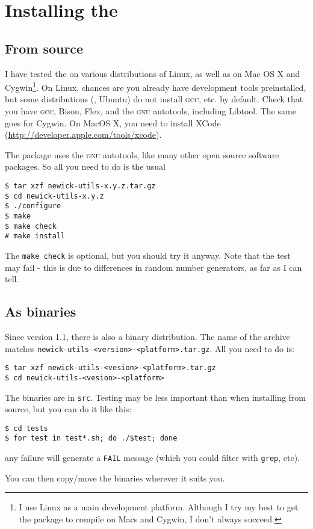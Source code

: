 \chapter{Installing the \nutils}

\section{From source}

I have tested the \nutils{} on various distributions of Linux, as well as on
Mac OS X and Cygwin\footnote{I use Linux as a main development platform.
Although I try my best to get the package to compile on Macs and Cygwin, I don't
always succeed.}. On Linux, chances are you already have development tools
preinstalled, but some distributions (\eg, Ubuntu) do not install \textsc{gcc},
etc. by default. Check that you have \textsc{gcc}, Bison, Flex, and the
\textsc{gnu} autotools, including Libtool. The same goes for Cygwin. On MacOS X,
you need to install XCode (\url{http://developer.apple.com/tools/xcode}).

The package uses the \textsc{gnu} autotools, like many other open source
software packages. So all you need to do is the usual
\begin{verbatim}
$ tar xzf newick-utils-x.y.z.tar.gz
$ cd newick-utils-x.y.z
$ ./configure
$ make
$ make check
# make install
\end{verbatim}
The \texttt{make check} is optional, but you should try it anyway. Note that
the \gen{} test may fail - this is due to differences in random number
generators, as far as I can tell.


\section{As binaries}

Since version 1.1, there is also a binary distribution. The name of the archive
matches \texttt{newick-utils-<version>-<platform>.tar.gz}. All you need to do is:

\begin{verbatim}
$ tar xzf newick-utils-<vesion>-<platform>.tar.gz
$ cd newick-utils-<vesion>-<platform>
\end{verbatim}

\noindent{}The binaries are in \texttt{src}. Testing may be less important than
when installing from source, but you can do it like this:

\begin{verbatim}
$ cd tests
$ for test in test*.sh; do ./$test; done 
\end{verbatim}

\noindent{}any failure will generate a \texttt{FAIL} message (which you could filter with \texttt{grep}, etc).

You can then copy/move the binaries wherever it suits you.


